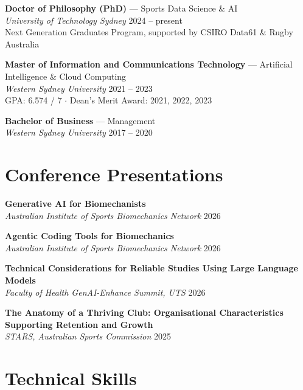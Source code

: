 \documentclass[11pt, a4paper]{article}
\begin{document}
\textbf{Doctor of Philosophy (PhD)} --- Sports Data Science \& AI \\
\textit{University of Technology Sydney} \hfill 2024 – present \\
Next Generation Graduates Program, supported by CSIRO Data61 \& Rugby Australia

\vspace{0.4em}

\textbf{Master of Information and Communications Technology} --- Artificial Intelligence \& Cloud Computing \\
\textit{Western Sydney University} \hfill 2021 – 2023 \\
GPA: 6.574 / 7 $\cdot$ Dean's Merit Award: 2021, 2022, 2023

\vspace{0.4em}

\textbf{Bachelor of Business} --- Management \\
\textit{Western Sydney University} \hfill 2017 – 2020

\section*{Conference Presentations}

\textbf{Generative AI for Biomechanists}\\
\textit{Australian Institute of Sports Biomechanics Network} \hfill 2026

\vspace{0.4em}

\textbf{Agentic Coding Tools for Biomechanics}\\
\textit{Australian Institute of Sports Biomechanics Network} \hfill 2026

\vspace{0.4em}

\textbf{Technical Considerations for Reliable Studies Using Large Language Models}\\
\textit{Faculty of Health GenAI-Enhance Summit, UTS} \hfill 2026

\vspace{0.4em}

\textbf{The Anatomy of a Thriving Club: Organisational Characteristics Supporting Retention and Growth}\\
\textit{STARS, Australian Sports Commission} \hfill 2025

\section*{Technical Skills}
\end{document}
